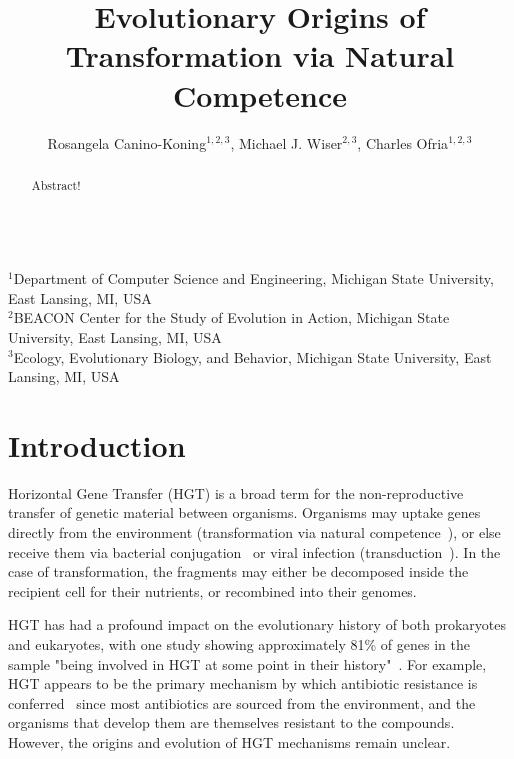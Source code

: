 \documentclass[letterpaper]{article}
\title{Evolutionary Origins of Transformation via Natural Competence}
\author{Rosangela Canino-Koning$^{1,2,3}$, Michael J. Wiser$^{2,3}$, Charles Ofria$^{1,2,3}$}
\begin{document}
\maketitle
~\\
$^{1}$Department of Computer Science and Engineering, Michigan State University, East Lansing, MI, USA \\
$^{2}$BEACON Center for the Study of Evolution in Action, Michigan State University, East Lansing, MI, USA \\
$^{3}$Ecology, Evolutionary Biology, and Behavior, Michigan State University, East Lansing, MI, USA\\

\begin{abstract}
Abstract!
\end{abstract}

\todototoc
\listoftodos

\section{Introduction}

Horizontal Gene Transfer (HGT) is a broad term for the non-reproductive transfer of genetic material between organisms. Organisms may uptake genes directly from the environment (transformation via natural competence~\cite{chen_dna_2004}), or else receive them via bacterial conjugation~\cite{lederberg_gene_1946} or viral infection (transduction~\cite{zinder_genetic_1952,lennox_transduction_1955}). In the case of transformation, the fragments may either be decomposed inside the recipient cell for their nutrients, or recombined into their genomes. 

HGT has had a profound impact on the evolutionary history of both prokaryotes and eukaryotes, with one study showing approximately 81\% of genes in the sample "being involved in HGT at some point in their history"~\cite{dagan_modular_2008}. For example, HGT appears to be the primary mechanism by which antibiotic resistance is conferred~\cite{davies_origins_1997,martinez_antibiotics_2008} since most antibiotics are sourced from the environment, and the organisms that develop them are themselves resistant to the compounds.
However, the origins and evolution of HGT mechanisms remain unclear. 
\end{document}
